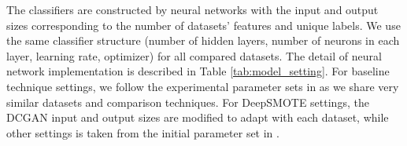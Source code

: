 The classifiers are constructed by neural networks with the input and output sizes corresponding to the number of datasets' features and unique labels. We use the same classifier structure (number of hidden layers, number of neurons in each layer, learning rate, optimizer) for all compared datasets. The detail of neural network implementation is described in Table \ref{tab:model_setting}. 
For baseline technique settings, we follow the experimental parameter sets in \cite{bib:GDO} as we share very similar datasets and comparison techniques. For DeepSMOTE settings, the DCGAN input and output sizes are modified to adapt with each dataset, while other settings is taken from the initial parameter set in \cite{deepsmote}.


\begin{table}[htbp!]
	\centering
	\caption{Classification models' setting for each dataset.}
	\label{tab:model_setting}
\end{table}%


